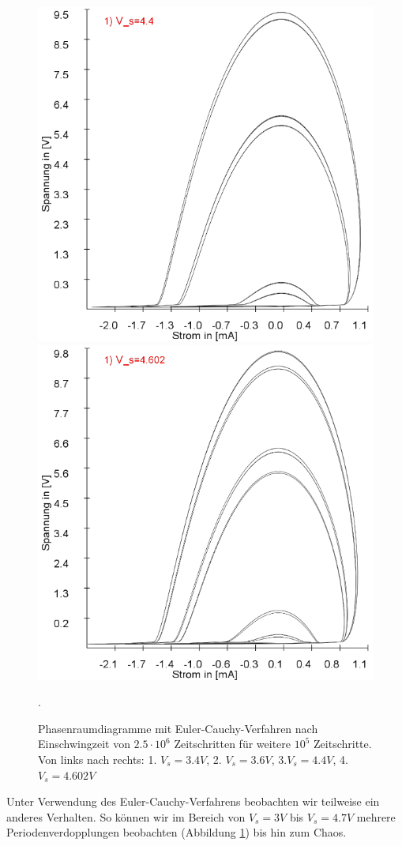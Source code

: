 \documentclass[11,5pt, twoside]{article}
\begin{document}
\begin{figure}[!htbp]
\includegraphics[scale=0.20]{schwing-euler-nach2500k-weitere100k-4,4V}
\includegraphics[scale=0.20]{schwing-euler-nach2500k-weitere100k-4,602V}
\caption{Phasenraumdiagramme mit Euler-Cauchy-Verfahren nach Einschwingzeit von $2.5\cdot10^6$ Zeitschritten für weitere $10^5$ Zeitschritte. Von links nach rechts: 1. $V_s=3.4V$, 2. $V_s=3.6V$, 3.$V_s=4.4V$, 4.$V_s=4.602V$ }. 
\label{fig:ldr-0005}
\end{figure}
Unter Verwendung des Euler-Cauchy-Verfahrens beobachten wir teilweise ein anderes Verhalten. So können wir im Bereich von $V_s=3V$ bis $V_s=4.7V$ mehrere Periodenverdopplungen beobachten (Abbildung \ref{fig:ldr-0005}) bis hin zum Chaos.
\pagebreak
\end{document}
